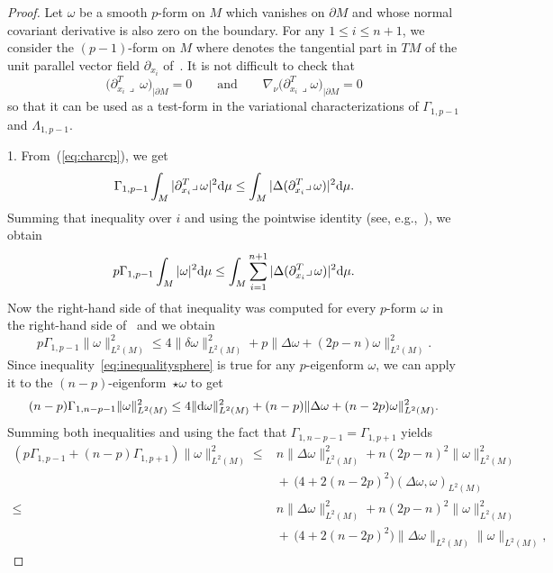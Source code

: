 \documentclass[pdftex]{sigma}
\numberwithin{equation}{section}
\theoremstyle{definition}
\begin{document}
\begin{proof} Let $\omega$ be a smooth $p$-form on $M$ which vanishes on $\partial M$ and whose normal covariant derivative is also zero on the boundary.
For any $1\leq i\leq n+1$, we consider the $(p-1)$-form  on $M$ where  denotes the tangential part in $TM$ of the unit parallel vector field $\partial_{x_i}$ of~. It is not difficult to check that
\[
\bigl(\partial_{x_i}^T\lrcorner\,\omega\bigr)_{|\partial M}=0\qquad\text{and}\qquad\nabla_{\nu}\bigl(\partial_{x_i}^T\lrcorner\omega\bigr)_{|\partial M}=0
\]
so that it can be used as a test-form in the variational characterizations of $\Gamma_{1,p-1}$ and $\Lambda_{1,p-1}$.

1. From~(\ref{eq:charcp}), we get
\[
\Gamma_{1,p-1}\int_M|\partial_{x_i}^T\lrcorner\,\omega|^2 {\rm d}\mu\leq\int_M|\Delta(\partial_{x_i}^T\lrcorner\,\omega)|^2{\rm d}\mu.
\]
Summing that inequality over $i$ and using the pointwise identity  (see, e.g.,~\cite[equation~(22)]{EGHM}), we obtain
\[
p\Gamma_{1,p-1}\int_M|\omega|^2 {\rm d}\mu\leq\int_M\sum_{i=1}^{n+1}|\Delta(\partial_{x_i}^T\lrcorner\,\omega)|^2{\rm d}\mu.
\]
Now the right-hand side of that inequality was computed for every $p$-form $\omega$ in the right-hand side of~\cite[equations~(31) and (33)]{EGHM} and we obtain
\begin{equation}\label{eq:inequalitysphere}
p\Gamma_{1,p-1} \|\omega\|^2_{L^2(M)} \leq 4\|\delta\omega\|^2_{L^2(M)}+p\|\Delta\omega+(2p-n)\omega\|^2_{L^2(M)}.
\end{equation}
Since inequality~\eqref{eq:inequalitysphere} is true for any $p$-eigenform $\omega$, we can apply it to the $(n-p)$-eigenform~$\star\omega$ to get
\[
(n-p) \Gamma_{1,n-p-1} \|\omega\|^2_{L^2(M)}\leq 4\|{\rm d}\omega\|^2_{L^2(M)}+(n-p)\|\Delta\omega+(n-2p)\omega\|^2_{L^2(M)}.
\]
Summing both inequalities and using the fact that $\Gamma_{1,n-p-1}=\Gamma_{1,p+1}$ yields
\begin{align*}%
 \left(p \Gamma_{1,p-1}+ (n-p) \Gamma_{1,p+1}\right)\|\omega\|^2_{L^2(M)} \leq{}& n\|\Delta\omega\|^2_{L^2(M)}+n(2p-n)^2\|\omega\|^2_{L^2(M)}\nonumber\\
&{}{+}\,\bigl(4+2(n-2p)^2\bigr) (\Delta\omega,\omega)_{L^2(M)}\nonumber\\
\leq{}& n\|\Delta\omega\|^2_{L^2(M)}+n(2p-n)^2\|\omega\|^2_{L^2(M)}\nonumber\\
&{}{+}\,\bigl(4+2(n-2p)^2\bigr) \|\Delta\omega\|_{L^2(M)}\|\omega\|_{L^2(M)},\nonumber

\end{align*}
\end{proof}
\end{document}
